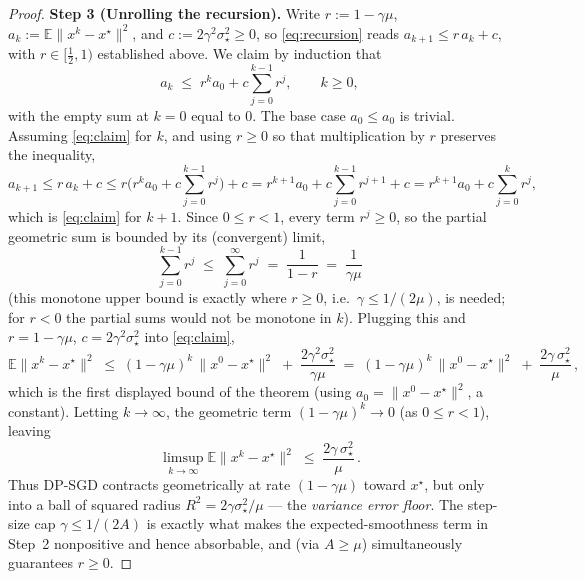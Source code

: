 \begin{proof}
\medskip
\noindent\textbf{Step 3 (Unrolling the recursion).}
Write $r:=1-\gamma\mu$, $a_k:=\mathbb E\|x^k-x^\star\|^2$, and $c:=2\gamma^2\sigma_\star^2\ge0$, so \eqref{eq:recursion} reads $a_{k+1}\le r\,a_k+c$, with $r\in[\tfrac12,1)$ established above. We claim by induction that
\begin{equation}\label{eq:claim}
a_k\;\le\;r^k a_0+c\sum_{j=0}^{k-1}r^j,\qquad k\ge0,
\end{equation}
with the empty sum at $k=0$ equal to $0$. The base case $a_0\le a_0$ is trivial. Assuming \eqref{eq:claim} for $k$, and using $r\ge0$ so that multiplication by $r$ preserves the inequality,
\[
a_{k+1}\le r\,a_k+c\le r\Big(r^k a_0+c\sum_{j=0}^{k-1}r^j\Big)+c
=r^{k+1}a_0+c\sum_{j=0}^{k-1}r^{j+1}+c
=r^{k+1}a_0+c\sum_{j=0}^{k}r^{j},
\]
which is \eqref{eq:claim} for $k+1$. Since $0\le r<1$, every term $r^j\ge0$, so the partial geometric sum is bounded by its (convergent) limit,
\[
\sum_{j=0}^{k-1}r^j\;\le\;\sum_{j=0}^{\infty}r^j\;=\;\frac{1}{1-r}\;=\;\frac{1}{\gamma\mu}
\]
(this monotone upper bound is exactly where $r\ge0$, i.e.\ $\gamma\le1/(2\mu)$, is needed; for $r<0$ the partial sums would not be monotone in $k$). Plugging this and $r=1-\gamma\mu$, $c=2\gamma^2\sigma_\star^2$ into \eqref{eq:claim},
\begin{equation}\label{eq:final}
\mathbb E\|x^k-x^\star\|^2\;\le\;(1-\gamma\mu)^k\,\|x^0-x^\star\|^2\;+\;\frac{2\gamma^2\sigma_\star^2}{\gamma\mu}
\;=\;(1-\gamma\mu)^k\,\|x^0-x^\star\|^2\;+\;\frac{2\gamma\,\sigma_\star^2}{\mu}\,,
\end{equation}
which is the first displayed bound of the theorem (using $a_0=\|x^0-x^\star\|^2$, a constant). Letting $k\to\infty$, the geometric term $(1-\gamma\mu)^k\to0$ (as $0\le r<1$), leaving
\begin{equation}\label{eq:limsup}
\limsup_{k\to\infty}\mathbb E\|x^k-x^\star\|^2\;\le\;\frac{2\gamma\,\sigma_\star^2}{\mu}\,.
\end{equation}
Thus DP-SGD contracts geometrically at rate $(1-\gamma\mu)$ toward $x^\star$, but only into a ball of squared radius $R^2=2\gamma\sigma_\star^2/\mu$ --- the \emph{variance error floor}. The step-size cap $\gamma\le 1/(2A)$ is exactly what makes the expected-smoothness term in Step~2 nonpositive and hence absorbable, and (via $A\ge\mu$) simultaneously guarantees $r\ge0$.


\end{proof}

